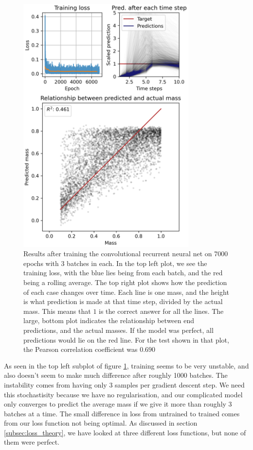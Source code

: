 \documentclass[a4paper]{article}
\begin{document}
\begin{figure}
    \centering
    \includegraphics[width=0.8\textwidth]{Figures/crnn_results_10.png}
    \caption{Results after training the convolutional recurrent neural net on 7000 epochs with 3 batches in each. In the top left plot, we see the training loss, with the blue lies being from each batch, and the red being a rolling average. The top right plot shows how the prediction of each case changes over time. Each line is one mass, and the height is what prediction is made at that time step, divided by the actual mass. This means that $1$ is the correct answer for all the lines. The large, bottom plot indicates the relationship between end predictions, and the actual masses. If the model was perfect, all predictions would lie on the red line. For the test shown in that plot, the Pearson correlation coefficient was $0.690$}
    \label{fig:crnn-results}
\end{figure}

As seen in the top left subplot of figure \ref{fig:crnn-results}, training seems to be very unstable, and also doesn't seem to make much difference after roughly 1000 batches. The instability comes from having only 3 samples per gradient descent step. We need this stochastisity because we have no regularisation, and our complicated model only converges to predict the average mass if we give it more than roughly 3 batches at a time. The small difference in loss from untrained to trained comes from our loss function not being optimal. As discussed in section \ref{subsec:loss_theory}, we have looked at three different loss functions, but none of them were perfect.
\end{document}
